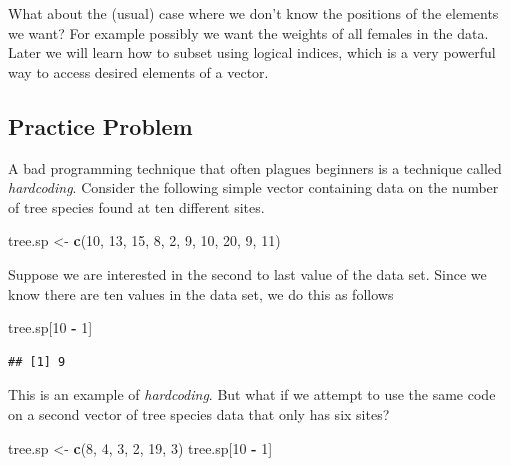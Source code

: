 \documentclass[
]{krantz}
\newenvironment{Shaded}{\begin{snugshade}}{\end{snugshade}}
\newcommand{\DecValTok}[1]{\textcolor[rgb]{0.00,0.00,0.81}{#1}}
\newcommand{\KeywordTok}[1]{\textcolor[rgb]{0.13,0.29,0.53}{\textbf{#1}}}
\newcommand{\NormalTok}[1]{#1}
\newcommand{\OperatorTok}[1]{\textcolor[rgb]{0.81,0.36,0.00}{\textbf{#1}}}
\newcommand{\StringTok}[1]{\textcolor[rgb]{0.31,0.60,0.02}{#1}}
\begin{document}
What about the (usual) case where we don't know the positions of the elements we want? For example possibly we want the weights of all females in the data. Later we will learn how to subset using logical indices, which is a very powerful way to access desired elements of a vector.

\hypertarget{ch4PP1}{%
\subsection{Practice Problem}\label{ch4PP1}}

A bad programming technique that often plagues beginners is a technique called \emph{hardcoding}. Consider the following simple vector containing data on the number of tree species found at ten different sites.

\begin{Shaded}
\begin{Highlighting}[]
\NormalTok{tree.sp \textless{}{-}}\StringTok{ }\KeywordTok{c}\NormalTok{(}\DecValTok{10}\NormalTok{, }\DecValTok{13}\NormalTok{, }\DecValTok{15}\NormalTok{, }\DecValTok{8}\NormalTok{, }\DecValTok{2}\NormalTok{, }\DecValTok{9}\NormalTok{, }\DecValTok{10}\NormalTok{, }\DecValTok{20}\NormalTok{, }\DecValTok{9}\NormalTok{, }\DecValTok{11}\NormalTok{)}
\end{Highlighting}
\end{Shaded}

Suppose we are interested in the second to last value of the data set. Since we know there are ten values in the data set, we do this as follows

\begin{Shaded}
\begin{Highlighting}[]
\NormalTok{tree.sp[}\DecValTok{10} \OperatorTok{{-}}\StringTok{ }\DecValTok{1}\NormalTok{]}
\end{Highlighting}
\end{Shaded}

\begin{verbatim}
## [1] 9
\end{verbatim}

This is an example of \emph{hardcoding}. But what if we attempt to use the same code on a second vector of tree species data that only has six sites?

\begin{Shaded}
\begin{Highlighting}[]
\NormalTok{tree.sp \textless{}{-}}\StringTok{ }\KeywordTok{c}\NormalTok{(}\DecValTok{8}\NormalTok{, }\DecValTok{4}\NormalTok{, }\DecValTok{3}\NormalTok{, }\DecValTok{2}\NormalTok{, }\DecValTok{19}\NormalTok{, }\DecValTok{3}\NormalTok{)}
\NormalTok{tree.sp[}\DecValTok{10} \OperatorTok{{-}}\StringTok{ }\DecValTok{1}\NormalTok{]}
\end{Highlighting}
\end{Shaded}
\end{document}
